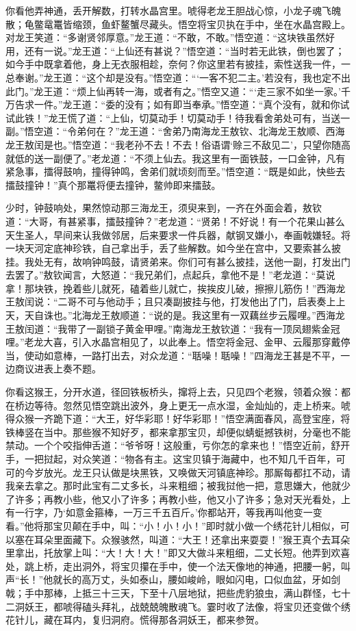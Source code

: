 \documentclass[12pt]{lsbook}
\begin{document}
你看他弄神通，丢开解数，打转水晶宫里。唬得老龙王胆战心惊，小龙子魂飞魄散；龟鳖鼋鼍皆缩颈，鱼虾鳌蟹尽藏头。悟空将宝贝执在手中，坐在水晶宫殿上。对龙王笑道：“多谢贤邻厚意。”龙王道：“不敢，不敢。”悟空道：“这块铁虽然好用，还有一说。”龙王道：“上仙还有甚说？”悟空道：“当时若无此铁，倒也罢了；如今手中既拿着他，身上无衣服相趁，奈何？你这里若有披挂，索性送我一件，一总奉谢。”龙王道：“这个却是没有。”悟空道：“‘一客不犯二主。’若没有，我也定不出此门。”龙王道：“烦上仙再转一海，或者有之。”悟空又道：“‘走三家不如坐一家。’千万告求一件。”龙王道：“委的没有；如有即当奉承。”悟空道：“真个没有，就和你试试此铁！”龙王慌了道：“上仙，切莫动手！切莫动手！待我看舍弟处可有，当送一副。”悟空道：“令弟何在？”龙王道：“舍弟乃南海龙王敖钦、北海龙王敖顺、西海龙王敖闰是也。”悟空道：“我老孙不去！不去！俗语谓‘赊三不敌见二’，只望你随高就低的送一副便了。”老龙道：“不须上仙去。我这里有一面铁鼓，一口金钟，凡有紧急事，擂得鼓响，撞得钟鸣，舍弟们就顷刻而至。”悟空道：“既是如此，快些去擂鼓撞钟！”真个那鼍将便去撞钟，鳖帅即来擂鼓。

少时，钟鼓响处，果然惊动那三海龙王，须臾来到，一齐在外面会着，敖钦道：“大哥，有甚紧事，擂鼓撞钟？”老龙道：“贤弟！不好说！有一个花果山甚么天生圣人，早间来认我做邻居，后来要求一件兵器，献钢叉嫌小，奉画戟嫌轻。将一块天河定底神珍铁，自己拿出手，丢了些解数。如今坐在宫中，又要索甚么披挂。我处无有，故响钟鸣鼓，请贤弟来。你们可有甚么披挂，送他一副，打发出门去罢了。”敖钦闻言，大怒道：“我兄弟们，点起兵，拿他不是！”老龙道：“莫说拿！那块铁，挽着些儿就死，磕着些儿就亡，挨挨皮儿破，擦擦儿筋伤！”西海龙王敖闰说：“二哥不可与他动手；且只凑副披挂与他，打发他出了门，启表奏上上天，天自诛也。”北海龙王敖顺道：“说的是。我这里有一双藕丝步云履哩。”西海龙王敖闰道：“我带了一副锁子黄金甲哩。”南海龙王敖钦道：“我有一顶凤翅紫金冠哩。”老龙大喜，引入水晶宫相见了，以此奉上。悟空将金冠、金甲、云履那穿戴停当，使动如意棒，一路打出去，对众龙道：“聒噪！聒噪！”四海龙王甚是不平，一边商议进表上奏不题。

你看这猴王，分开水道，径回铁板桥头，撺将上去，只见四个老猴，领着众猴：都在桥边等待。忽然见悟空跳出波外，身上更无一点水湿，金灿灿的，走上桥来。唬得众猴一齐跪下道：“大王，好华彩耶！好华彩耶！”悟空满面春风，高登宝座，将铁棒竖在当中。那些猴不知好歹，都来拿那宝贝，却便似蜻蜓撼铁树，分毫也不能禁动。一个个咬指伸舌道：“爷爷呀！这般重，亏你怎的拿来也！”悟空近前，舒开手，一把挝起，对众笑道：“物各有主。这宝贝镇于海藏中，也不知几千百年，可可的今岁放光。龙王只认做是块黑铁，又唤做天河镇底神珍。那厮每都扛不动，请我亲去拿之。那时此宝有二丈多长，斗来粗细；被我挝他一把，意思嫌大，他就少了许多；再教小些，他又小了许多；再教小些，他又小了许多；急对天光看处，上有一行字，乃‘如意金箍棒，一万三千五百斤。’你都站开，等我再叫他变一变看。”他将那宝贝颠在手中，叫：“小！小！小！”即时就小做一个绣花针儿相似，可以塞在耳朵里面藏下。众猴骇然，叫道：“大王！还拿出来耍耍！”猴王真个去耳朵里拿出，托放掌上叫：“大！大！大！”即又大做斗来粗细，二丈长短。他弄到欢喜处，跳上桥，走出洞外，将宝贝攥在手中，使一个法天像地的神通，把腰一躬，叫声“长！”他就长的高万丈，头如泰山，腰如峻岭，眼如闪电，口似血盆，牙如剑戟；手中那棒，上抵三十三天，下至十八层地狱，把些虎豹狼虫，满山群怪，七十二洞妖王，都唬得磕头拜礼，战兢兢魄散魂飞。霎时收了法像，将宝贝还变做个绣花针儿，藏在耳内，复归洞府。慌得那各洞妖王，都来参贺。
\end{document}
